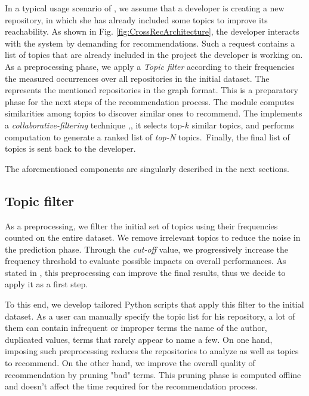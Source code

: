
In a typical usage scenario of \CT, we assume that a developer is creating a new \GH repository, in which she has already included some topics to improve its reachability.
As shown in Fig. \ref{fig:CrossRecArchitecture}, the developer interacts with the system by demanding for recommendations.
Such a request contains a list of topics that are already included in the project the developer is working on. As a preprocessing phase, we apply a \emph{Topic filter} according to their frequencies \ie the measured occurrences over all repositories in the initial dataset. 
The  represents
the mentioned repositories in the graph format. This is a preparatory phase for the next steps of the recommendation process. The  module computes similarities among topics to discover similar ones to recommend. The  
implements a \emph{collaborative-filtering} technique
\cite{Aggarwal2016},\cite{Zhao:2010:UCR:1748610.1749278}, it selects top-$k$ similar topics, and performs computation to generate a ranked list of \emph{top-N}
topics.~Finally, the final list of topics is sent back to the developer.

The aforementioned components are singularly described in the next sections.

\subsection{Topic filter}  \label{sec:filter}
As a preprocessing, we filter the initial set of topics using their frequencies counted on the entire \GH dataset. We remove irrelevant topics to reduce the noise in the prediction phase. Through the \emph{cut-off} value, we progressively increase the frequency threshold to evaluate possible impacts on overall performances. As stated in \cite{repo-topix}, this preprocessing can improve the final results, thus we decide to apply it as a first step. 

To this end, we develop tailored Python scripts that apply this filter to the initial dataset. As a \GH user can manually specify the topic list for his repository, a lot of them can contain infrequent or improper terms \ie the name of the author, duplicated values, terms that rarely appear to name a few. On one hand, imposing such preprocessing reduces the repositories to analyze as well as topics to recommend. On the other hand, we improve the overall quality of recommendation by pruning "bad" terms. 
This pruning phase is computed offline and doesn't affect the time required for the recommendation process. 



